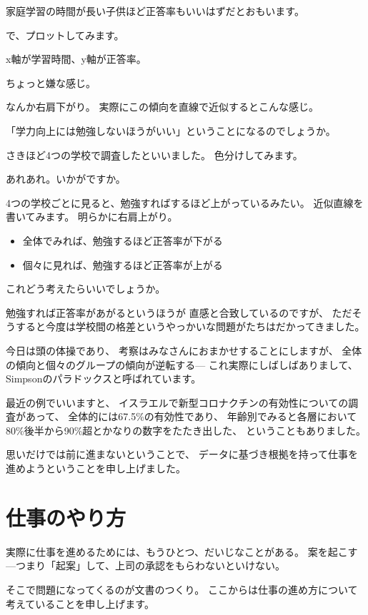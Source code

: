 \documentclass[uplatex,jis2004,dvipdfmx,12pt]{jsarticle}
\begin{document}
家庭学習の時間が長い子供ほど正答率もいいはずだとおもいます。

で、プロットしてみます。

x軸が学習時間、y軸が正答率。

ちょっと嫌な感じ。

なんか右肩下がり。
実際にこの傾向を直線で近似するとこんな感じ。

「学力向上には勉強しないほうがいい」ということになるのでしょうか。

さきほど4つの学校で調査したといいました。
色分けしてみます。

あれあれ。いかがですか。

4つの学校ごとに見ると、勉強すればするほど上がっているみたい。
近似直線を書いてみます。
明らかに右肩上がり。


\begin{itemize}
 \item 全体でみれば、勉強するほど正答率が下がる
 \item 個々に見れば、勉強するほど正答率が上がる
\end{itemize}
これどう考えたらいいでしょうか。

勉強すれば正答率があがるというほうが
直感と合致しているのですが、
ただそうすると今度は学校間の格差というやっかいな問題がたちはだかってきました。

今日は頭の体操であり、
考察はみなさんにおまかせすることにしますが、
全体の傾向と個々のグループの傾向が逆転する---
これ実際にしばしばありまして、
Simpsonのパラドックスと呼ばれています。

最近の例でいいますと、
イスラエルで新型コロナクチンの有効性についての調査があって、
全体的には67.5\%の有効性であり、
年齢別でみると各層において80\%後半から90\%超とかなりの数字をたたき出した、
ということもありました。




思いだけでは前に進まないということで、
データに基づき根拠を持って仕事を進めようということを申し上げました。
\newpage

\section{仕事のやり方}


実際に仕事を進めるためには、もうひとつ、だいじなことがある。
案を起こす---つまり「起案」して、上司の承認をもらわないといけない。

そこで問題になってくるのが文書のつくり。
ここからは仕事の進め方について考えていることを申し上げます。
\end{document}
